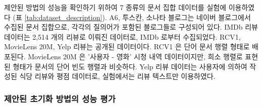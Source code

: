 \documentclass[11pt]{article}
\begin{document}
제안된 방법의 성능을 확인하기 위하여 7 종류의 문서 집합 데이터를 실험에 이용하였다 (표 \ref{tab:dataset_description}).
A6, 투스칸, 소나타 블로그는 네이버 블로그에서 수집된 문서 집합으로, 각각의 질의어가 포함된 블로그들로 구성되어 있다.
IMDb 리뷰 데이터는 2,514 개의 리뷰로 이뤄진 데이터로, IMDb 로부터 수집되었다.
RCV1, MovieLens 20M, Yelp 리뷰는 공개된 데이터이다.
RCV1 은 단어 문서 행렬 형태로 배포된다.
MovieLens 20M 은 '사용자 - 영화' 시청 내역 데이터이지만, 희소 행렬로 표현된 형태가 문서의 단어 빈도 행렬과 비슷하다.
Yelp 리뷰 데이터는 사용자에 의하여 작성된 식당 리뷰와 평점 데이터로, 실험에서는 리뷰 텍스트만 이용하였다.

\begin{table}[H]
\centering
\caption{실험에 이용한 7 종류의 데이터셋}
\label{tab:dataset_description}
\end{table}

\subsubsection{제안된 초기화 방법의 성능 평가}
\end{document}
